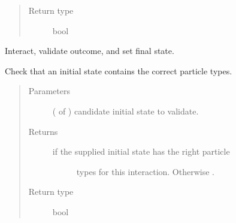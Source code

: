 \documentclass[letterpaper,10pt,english]{sphinxmanual}
\begin{document}
\begin{fulllineitems}
\begin{fulllineitems}
\begin{quote}
\begin{description}
\item[{Return type}] \leavevmode
bool

\end{description}\end{quote}

\end{fulllineitems}


\begin{fulllineitems}
\label{\detokenize{code_structure:scdc.interaction.Interaction.interact}}
Interact, validate outcome, and set final state.

\end{fulllineitems}


\begin{fulllineitems}
\label{\detokenize{code_structure:scdc.interaction.Interaction.valid_initial}}
Check that an initial state contains the correct particle types.
\begin{quote}\begin{description}
\item[{Parameters}] \leavevmode
{} ( of ) \textendash{} candidate initial
state to validate.

\item[{Returns}] \leavevmode
\begin{description}
\item[{ if the supplied initial state has the right particle}] \leavevmode
types for this interaction. Otherwise .

\end{description}


\item[{Return type}] \leavevmode
bool

\end{description}\end{quote}

\end{fulllineitems}


\end{fulllineitems}
\end{document}
